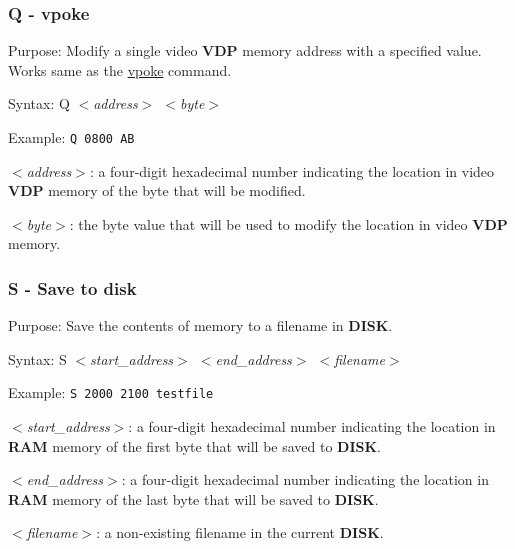         \subsubsection{Q - vpoke}

        Purpose: Modify a single video \textbf{VDP} memory address with a
        specified value. Works same as the \hyperref[cmd:vpoke]{vpoke} command.

        Syntax: Q \textit{$<$address$>$ $<$byte$>$}

        Example: \texttt{Q 0800 AB}

        \hspace{1cm}\textit{$<$address$>$}: a four-digit hexadecimal number
        indicating the location in video \textbf{VDP} memory of the byte that
        will be modified.

        \hspace{1cm}\textit{$<$byte$>$}: the byte value that will be used to
        modify the location in video \textbf{VDP} memory.

        \subsubsection{S - Save to disk}

        Purpose: Save the contents of memory to a filename in \textbf{DISK}.

        Syntax: S \textit{$<$start\_address$>$ $<$end\_address$>$ $<$filename$>$}

        Example: \texttt{S 2000 2100 testfile}

        \hspace{1cm}\textit{$<$start\_address$>$}: a four-digit hexadecimal
        number indicating the location in \textbf{RAM} memory of the first byte
        that will be saved to \textbf{DISK}.

        \hspace{1cm}\textit{$<$end\_address$>$}: a four-digit hexadecimal
        number indicating the location in \textbf{RAM} memory of the last byte
        that will be saved to \textbf{DISK}.

        \hspace{1cm}\textit{$<$filename$>$}: a non-existing filename in the
        current \textbf{DISK}.

